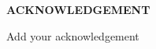 \thispagestyle{empty}
\begin{center}
    \Large \bfseries  {ACKNOWLEDGEMENT} \\[1cm] 
\end{center}

\vspace{2\baselineskip}

\noindent
Add your acknowledgement

\vspace{1\baselineskip}
\noindent
\myname 


